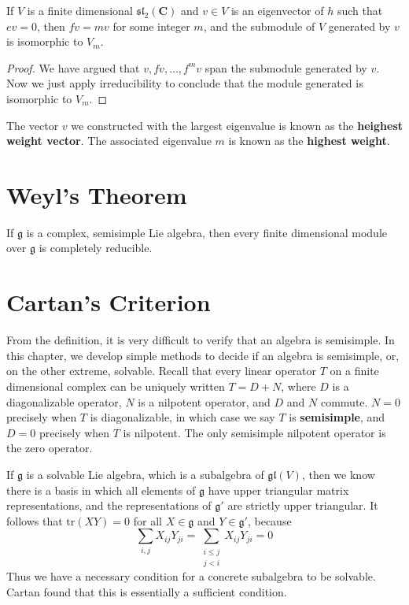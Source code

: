\begin{corollary}
    If $V$ is a finite dimensional $\mathfrak{sl}_2(\mathbf{C})$ and $v \in V$ is an eigenvector of $h$ such that $ev = 0$, then $fv = mv$ for some integer $m$, and the submodule of $V$ generated by $v$ is isomorphic to $V_m$.
\end{corollary}
\begin{proof}
    We have argued that $v, fv, \dots, f^m v$ span the submodule generated by $v$. Now we just apply irreducibility to conclude that the module generated is isomorphic to $V_m$.
\end{proof}

The vector $v$ we constructed with the largest eigenvalue is known as the {\bf heighest weight vector}. The associated eigenvalue $m$ is known as the {\bf highest weight}.

\section{Weyl's Theorem}

\begin{theorem}[Weyl]
    If $\mathfrak{g}$ is a complex, semisimple Lie algebra, then every finite dimensional module over $\mathfrak{g}$ is completely reducible.
\end{theorem}

\section{Cartan's Criterion}

From the definition, it is very difficult to verify that an algebra is semisimple. In this chapter, we develop simple methods to decide if an algebra is semisimple, or, on the other extreme, solvable. Recall that every linear operator $T$ on a finite dimensional complex can be uniquely written $T = D + N$, where $D$ is a diagonalizable operator, $N$ is a nilpotent operator, and $D$ and $N$ commute. $N = 0$ precisely when $T$ is diagonalizable, in which case we say $T$ is {\bf semisimple}, and $D = 0$ precisely when $T$ is nilpotent. The only semisimple nilpotent operator is the zero operator.

If $\mathfrak{g}$ is a solvable Lie algebra, which is a subalgebra of $\mathfrak{gl}(V)$, then we know there is a basis in which all elements of $\mathfrak{g}$ have upper triangular matrix representations, and the representations of $\mathfrak{g}'$ are strictly upper triangular. It follows that $\text{tr}(XY) = 0$ for all $X \in \mathfrak{g}$ and $Y \in \mathfrak{g}'$, because
%
\[ \sum_{i,j} X_{ij}Y_{ji} = \sum_{\substack{i \leq j\\j < i}} X_{ij} Y_{ji} = 0 \]
%
Thus we have a necessary condition for a concrete subalgebra to be solvable. Cartan found that this is essentially a sufficient condition.

